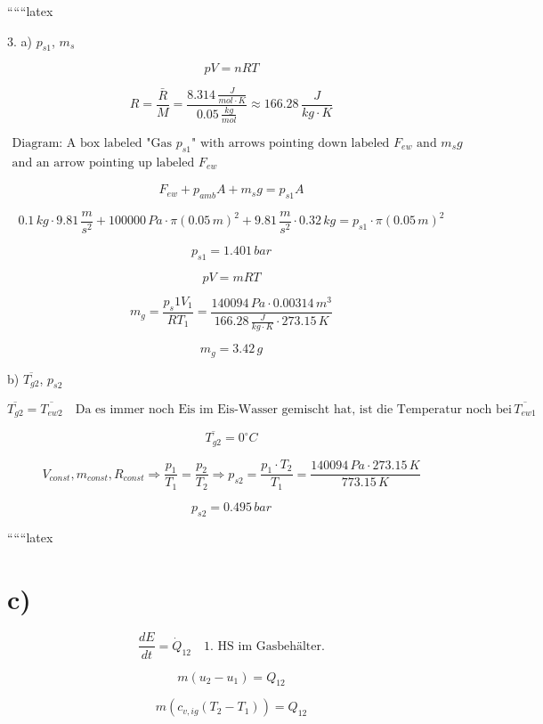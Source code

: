 
``````latex


3. a) $p_{s1}$, $m_s$

\[
pV = nRT
\]

\[
R = \frac{\bar{R}}{M} = \frac{8.314 \, \frac{J}{mol \cdot K}}{0.05 \, \frac{kg}{mol}} \approx 166.28 \, \frac{J}{kg \cdot K}
\]


\[
\begin{array}{c}
\text{Diagram: A box labeled "Gas $p_{s1}$" with arrows pointing down labeled $F_{ew}$ and $m_s g$} \\
\text{and an arrow pointing up labeled $F_{ew}$}
\end{array}
\]

\[
F_{ew} + p_{amb} A + m_s g = p_{s1} A
\]

\[
0.1 \, kg \cdot 9.81 \, \frac{m}{s^2} + 100000 \, Pa \cdot \pi (0.05 \, m)^2 + 9.81 \, \frac{m}{s^2} \cdot 0.32 \, kg = p_{s1} \cdot \pi (0.05 \, m)^2
\]

\[
p_{s1} = 1.401 \, bar
\]


\[
pV = mRT
\]

\[
m_g = \frac{p_s1 V_1}{R T_1} = \frac{140094 \, Pa \cdot 0.00314 \, m^3}{166.28 \, \frac{J}{kg \cdot K} \cdot 273.15 \, K}
\]

\[
m_g = 3.42 \, g
\]

b) $\overline{T_{g2}}$, $p_{s2}$

\[
\overline{T_{g2}} = \overline{T_{ew2}} \quad \text{Da es immer noch Eis im Eis-Wasser gemischt hat, ist die Temperatur noch bei} \, \overline{T_{ew1}}
\]

\[
\overline{T_{g2}} = 0^\circ C
\]

\[
V_{const}, m_{const}, R_{const} \Rightarrow \frac{p_1}{T_1} = \frac{p_2}{T_2} \Rightarrow p_{s2} = \frac{p_1 \cdot T_2}{T_1} = \frac{140094 \, Pa \cdot 273.15 \, K}{773.15 \, K}
\]

\[
p_{s2} = 0.495 \, bar
\]

``````latex


\section*{c)}

\[
\frac{dE}{dt} = \dot{Q}_{12} \quad \text{1. HS im Gasbehälter.}
\]

\[
m (u_2 - u_1) = Q_{12}
\]

\[
m \left( c_{v,ig} (T_2 - T_1) \right) = Q_{12}
\]

